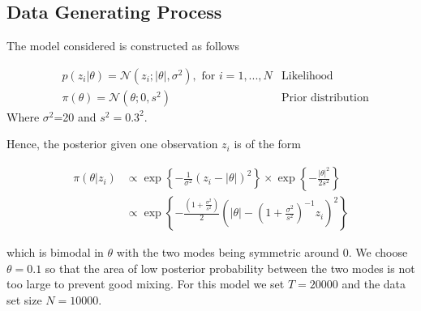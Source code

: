 \documentclass[11pt,a4paper]{report}\usepackage[]{graphicx}\usepackage[]{color}
\begin{document}
\subsection{Data Generating Process}

The model considered is constructed as follows

\begin{align}
\label{eq:1}
&p(z_i|\theta)=\mathcal N(z_i;|\theta|,\sigma^2),\text{ for $i=1,...,N$}&\text{Likelihood}\\
\label{eq:2}
&\pi(\theta)=\mathcal N(\theta;0,s^2)&\text{Prior distribution}
\end{align}
Where $\sigma^2$=20 and $s^2=0.3^2$.

Hence, the posterior given one observation $z_i$ is of the form

\begin{align*}
\pi(\theta|z_i)&\propto \exp\left\{-\frac{1}{\sigma^2}(z_i-|\theta|)^2\right\}\times\exp\left\{-\frac{|\theta|^2}{2s^2}\right\}\\
&\propto \exp\left\{-\frac{(1+\frac{\sigma^2}{s^2})}{2}(|\theta|-(1+\frac{\sigma^2}{s^2})^{-1}z_i)^2\right\}
\end{align*}

which is bimodal in $\theta$ with the two modes being symmetric around 0. We choose $\theta=0.1$ so that the area of low posterior probability between the two modes is not too large to prevent good mixing. 
For this model we set $T=20000$ and the data set size $N=10000$.
\end{document}
